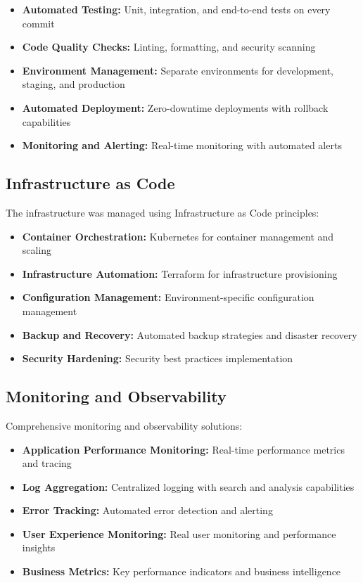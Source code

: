 \documentclass[conference]{IEEEtran}
\begin{document}
\begin{itemize}
    \item \textbf{Automated Testing:} Unit, integration, and end-to-end tests on every commit
    \item \textbf{Code Quality Checks:} Linting, formatting, and security scanning
    \item \textbf{Environment Management:} Separate environments for development, staging, and production
    \item \textbf{Automated Deployment:} Zero-downtime deployments with rollback capabilities
    \item \textbf{Monitoring and Alerting:} Real-time monitoring with automated alerts
\end{itemize}

\subsection{Infrastructure as Code}
The infrastructure was managed using Infrastructure as Code principles:

\begin{itemize}
    \item \textbf{Container Orchestration:} Kubernetes for container management and scaling
    \item \textbf{Infrastructure Automation:} Terraform for infrastructure provisioning
    \item \textbf{Configuration Management:} Environment-specific configuration management
    \item \textbf{Backup and Recovery:} Automated backup strategies and disaster recovery
    \item \textbf{Security Hardening:} Security best practices implementation
\end{itemize}

\subsection{Monitoring and Observability}
Comprehensive monitoring and observability solutions:

\begin{itemize}
    \item \textbf{Application Performance Monitoring:} Real-time performance metrics and tracing
    \item \textbf{Log Aggregation:} Centralized logging with search and analysis capabilities
    \item \textbf{Error Tracking:} Automated error detection and alerting
    \item \textbf{User Experience Monitoring:} Real user monitoring and performance insights
    \item \textbf{Business Metrics:} Key performance indicators and business intelligence
\end{itemize}
\end{document}
